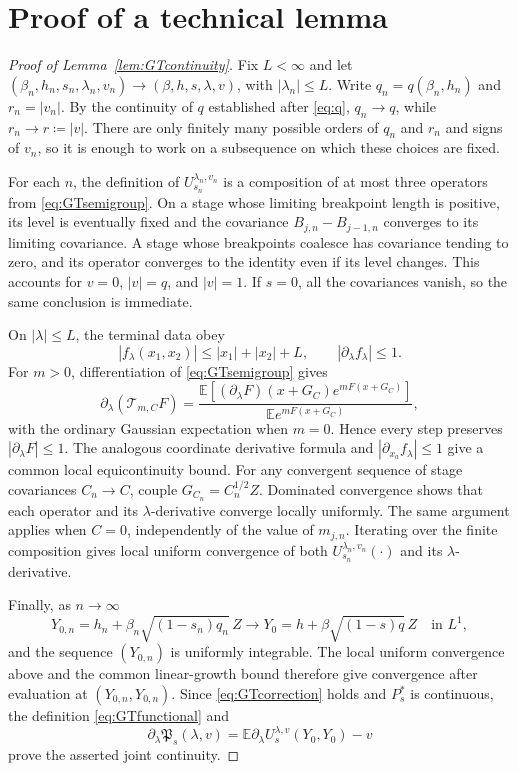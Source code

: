 \documentclass[11pt]{article}
\numberwithin{equation}{section}
\newcommand{\E}{\mathbb{E}}
\newcommand{\1}{\mathbf 1}
\begin{document}
\section{Proof of a technical lemma}\label{app: technical}
\begin{proof}[Proof of Lemma~\ref{lem:GTcontinuity}]
Fix $L<\infty$ and let
$(\beta_n,h_n,s_n,\lambda_n,v_n)\to(\beta,h,s,\lambda,v)$, with
$|\lambda_n|\le L$.  Write $q_n=q(\beta_n,h_n)$ and $r_n=|v_n|$.
By the continuity of $q$ established after \eqref{eq:q}, $q_n\to q$,
while $r_n\to r\coloneqq|v|$.  There are only finitely many possible
orders of $q_n$ and $r_n$ and signs of $v_n$, so it is enough to work
on a subsequence on which these choices are fixed.

For each $n$, the definition of $U_{s_n}^{\lambda_n,v_n}$ is a
composition of at most three operators from \eqref{eq:GTsemigroup}.
On a stage whose limiting breakpoint length is positive, its level is
eventually fixed and the covariance
$B_{j,n}-B_{j-1,n}$ converges to its limiting covariance.  A stage
whose breakpoints coalesce has covariance tending to zero, and its
operator converges to the identity even if its level changes.  This
accounts for $v=0$, $|v|=q$, and $|v|=1$.  If $s=0$, all the
covariances vanish, so the same conclusion is immediate.

On $|\lambda|\le L$, the terminal data obey
\[
 |f_\lambda(x_1,x_2)|\le |x_1|+|x_2|+L,
 \qquad |\partial_\lambda f_\lambda|\le1.
\]
For $m>0$, differentiation of \eqref{eq:GTsemigroup} gives
\[
 \partial_\lambda(\mathcal T_{m,C}F)
 =\frac{\E[(\partial_\lambda F)(x+G_C)e^{mF(x+G_C)}]}
        {\E e^{mF(x+G_C)}},
\]
with the ordinary Gaussian expectation when $m=0$.  Hence every step
preserves $|\partial_\lambda F|\le1$.  The analogous coordinate
derivative formula and $|\partial_{x_a}f_\lambda|\le1$ give a common
local equicontinuity bound.  For any convergent sequence of stage
covariances $C_n\to C$, couple
$G_{C_n}=C_n^{1/2}Z$.  Dominated convergence shows that each operator
and its $\lambda$-derivative converge locally uniformly.  The same
argument applies when $C=0$, independently of the value of $m_{j,n}$.
Iterating over the finite composition gives
local uniform convergence of both $U_{s_n}^{\lambda_n,v_n}(\cdot)$
and its $\lambda$-derivative.

Finally, as $n\to \infty$
\[
 Y_{0,n}=h_n+\beta_n\sqrt{(1-s_n)q_n}\,Z\longrightarrow
 Y_0=h+\beta\sqrt{(1-s)q}\,Z
 \quad\text{in }L^1,
\]
and the sequence $(Y_{0,n})$ is uniformly integrable.  The local
uniform convergence above and the common linear-growth bound therefore
give convergence after evaluation at $(Y_{0,n},Y_{0,n})$.  Since
\eqref{eq:GTcorrection} holds and $P_s^*$ is continuous, the
definition \eqref{eq:GTfunctional} and
\[
 \partial_\lambda\mathfrak P_s(\lambda,v)
 =\E\partial_\lambda U_s^{\lambda,v}(Y_0,Y_0)-v
\]
prove the asserted joint continuity.
\end{proof}
\end{document}
